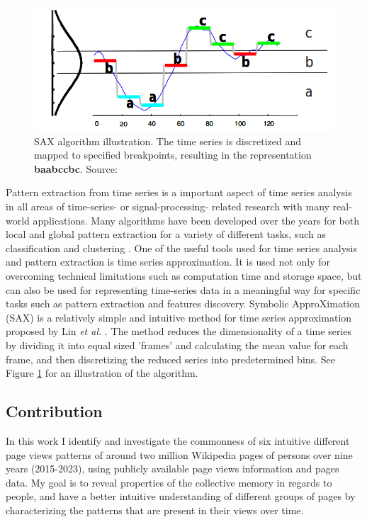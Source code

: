 \documentclass[titlepage]{article}
\begin{document}
\begin{figure}
    \centering
    \includegraphics[width=0.8\linewidth]{figures/sax_illustration_lin_etal.png}
    \caption{SAX algorithm illustration. The time series is discretized and mapped to specified breakpoints, resulting in the representation \textbf{baabccbc}. Source: \cite{linExperiencingSAXNovel2007}}
    \label{fig:sax-illustration}
\end{figure}
Pattern extraction from time series is a important aspect of time series analysis in all areas of time-series- or signal-processing- related research with many real-world applications. Many algorithms have been developed over the years for both local and global pattern extraction for a variety of different tasks, such as classification \cite{geurtsPatternExtractionTime2001} \cite{yeTimeSeriesShapelets2009} and clustering \cite{ulanovaScalableClusteringTime2015}.
One of the useful tools used for time series analysis and pattern extraction is time series approximation. It is used not only for overcoming technical limitations such as computation time and storage space, but can also be used for representing time-series data in a meaningful way for specific tasks such as pattern extraction and features discovery. Symbolic ApproXimation (SAX) is a relatively simple and intuitive method for time series approximation proposed by Lin \textit{et al.} \cite{linExperiencingSAXNovel2007}. The method reduces the dimensionality of a time series by dividing it into equal sized 'frames' and calculating the mean value for each frame, and then discretizing the reduced series into predetermined bins. See Figure \ref{fig:sax-illustration} for an illustration of the algorithm.

\subsection{Contribution}
In this work I identify and investigate the commonness of six intuitive different page views patterns of around two million Wikipedia pages of persons over nine years (2015-2023), using publicly available page views information and pages data. My goal is to reveal properties of the collective memory in regards to people, and have a better intuitive understanding of different groups of pages by characterizing the patterns that are present in their views over time.
\end{document}
